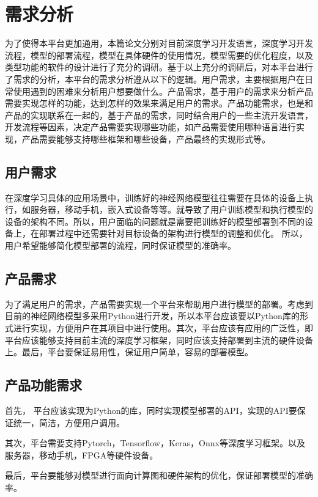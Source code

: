 \chapter{需求分析}

为了使得本平台更加通用，本篇论文分别对目前深度学习开发语言，深度学习开发流程，模型的部署流程，模型在具体硬件的使用情况，模型需要的优化程度，以及类型功能的软件的设计进行了充分的调研。基于以上充分的调研后，对本平台进行了需求的分析，本平台的需求分析遵从以下的逻辑。用户需求，主要根据用户在日常使用遇到的困难来分析用户想要做什么。产品需求，基于用户的需求来分析产品需要实现怎样的功能，达到怎样的效果来满足用户的需求。产品功能需求，也是和产品的实现联系在一起的，基于产品的需求，同时结合用户的一些主流开发语言，开发流程等因素，决定产品需要实现哪些功能，如产品需要使用哪种语言进行实现，产品需要能够支持哪些框架和哪些设备，产品最终的实现形式等。


\section{用户需求}

在深度学习具体的应用场景中，训练好的神经网络模型往往需要在具体的设备上执行，如服务器，移动手机，嵌入式设备等等。就导致了用户训练模型和执行模型的设备的架构不同。所以，用户面临的问题就是需要把训练好的模型部署到不同的设备上，在部署过程中还需要针对目标设备的架构进行模型的调整和优化。 所以，用户希望能够简化模型部署的流程，同时保证模型的准确率。


\section{产品需求}

为了满足用户的需求，产品需要实现一个平台来帮助用户进行模型的部署。考虑到目前的神经网络模型多采用Python进行开发，所以本平台应该要以Python库的形式进行实现，方便用户在其项目中进行使用。其次，平台应该有应用的广泛性，即平台应该能够支持目前主流的深度学习框架，同时应该支持部署到主流的硬件设备上。最后，平台要保证易用性，保证用户简单，容易的部署模型。


\section{产品功能需求}

首先， 平台应该实现为Python的库，同时实现模型部署的API，实现的API要保证统一，简洁，方便用户调用。

其次，平台需要支持Pytorch，Tensorflow，Keras，Onnx等深度学习框架。以及服务器，移动手机，FPGA等硬件设备。

最后，平台要能够对模型进行面向计算图和硬件架构的优化，保证部署模型的准确率。
